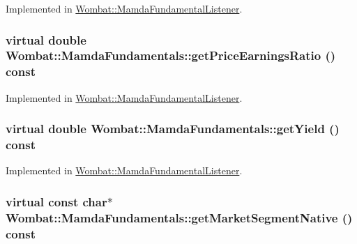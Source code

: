 Implemented in \hyperlink{classWombat_1_1MamdaFundamentalListener_641fd03980bd391579bb99ac1393594e}{Wombat::Mamda\-Fundamental\-Listener}.\hypertarget{classWombat_1_1MamdaFundamentals_1072c58f01ad734655f34332bc9e8055}{
\subsubsection[getPriceEarningsRatio]{\setlength{\rightskip}{0pt plus 5cm}virtual double Wombat::Mamda\-Fundamentals::get\-Price\-Earnings\-Ratio () const}}
\label{classWombat_1_1MamdaFundamentals_1072c58f01ad734655f34332bc9e8055}




Implemented in \hyperlink{classWombat_1_1MamdaFundamentalListener_c075de507dd9561ed9af165d56674410}{Wombat::Mamda\-Fundamental\-Listener}.\hypertarget{classWombat_1_1MamdaFundamentals_3d9a05c2c0adbb5acaf08d4bc1cce29c}{
\subsubsection[getYield]{\setlength{\rightskip}{0pt plus 5cm}virtual double Wombat::Mamda\-Fundamentals::get\-Yield () const}}
\label{classWombat_1_1MamdaFundamentals_3d9a05c2c0adbb5acaf08d4bc1cce29c}




Implemented in \hyperlink{classWombat_1_1MamdaFundamentalListener_89cfb3cdee2c8597e1684e71c69fc50a}{Wombat::Mamda\-Fundamental\-Listener}.\hypertarget{classWombat_1_1MamdaFundamentals_e72366f03a1ddcaa3d0e75fafaaddf60}{
\subsubsection[getMarketSegmentNative]{\setlength{\rightskip}{0pt plus 5cm}virtual const char$\ast$ Wombat::Mamda\-Fundamentals::get\-Market\-Segment\-Native () const}}
\label{classWombat_1_1MamdaFundamentals_e72366f03a1ddcaa3d0e75fafaaddf60}




